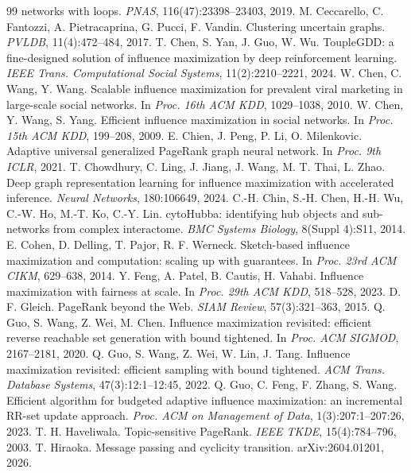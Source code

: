 \documentclass[11pt,a4paper]{article}
\begin{document}
\begin{thebibliography}{99}
networks with loops. \emph{PNAS}, 116(47):23398--23403, 2019.
 M. Ceccarello, C. Fantozzi, A. Pietracaprina, G. Pucci,
F. Vandin. Clustering uncertain graphs. \emph{PVLDB}, 11(4):472--484, 2017.
 T. Chen, S. Yan, J. Guo, W. Wu. ToupleGDD: a
fine-designed solution of influence maximization by deep reinforcement
learning. \emph{IEEE Trans. Computational Social Systems},
11(2):2210--2221, 2024.
 W. Chen, C. Wang, Y. Wang. Scalable influence maximization for
prevalent viral marketing in large-scale social networks. In \emph{Proc. 16th
ACM KDD}, 1029--1038, 2010.
 W. Chen, Y. Wang, S. Yang. Efficient influence maximization
in social networks. In \emph{Proc. 15th ACM KDD}, 199--208, 2009.
 E. Chien, J. Peng, P. Li, O. Milenkovic. Adaptive
universal generalized PageRank graph neural network. In \emph{Proc. 9th
ICLR}, 2021.
 T. Chowdhury, C. Ling, J. Jiang, J. Wang, M. T. Thai,
L. Zhao. Deep graph representation learning for influence maximization with
accelerated inference. \emph{Neural Networks}, 180:106649, 2024.
 C.-H. Chin, S.-H. Chen, H.-H. Wu, C.-W. Ho, M.-T. Ko,
C.-Y. Lin. cytoHubba: identifying hub objects and sub-networks from complex
interactome. \emph{BMC Systems Biology}, 8(Suppl 4):S11, 2014.
 E. Cohen, D. Delling, T. Pajor, R. F. Werneck. Sketch-based
influence maximization and computation: scaling up with guarantees. In
\emph{Proc. 23rd ACM CIKM}, 629--638, 2014.
 Y. Feng, A. Patel, B. Cautis, H. Vahabi. Influence
maximization with fairness at scale. In \emph{Proc. 29th ACM KDD},
518--528, 2023.
 D. F. Gleich. PageRank beyond the Web. \emph{SIAM Review},
57(3):321--363, 2015.
 Q. Guo, S. Wang, Z. Wei, M. Chen. Influence maximization
revisited: efficient reverse reachable set generation with bound tightened.
In \emph{Proc. ACM SIGMOD}, 2167--2181, 2020.
 Q. Guo, S. Wang, Z. Wei, W. Lin, J. Tang. Influence
maximization revisited: efficient sampling with bound tightened. \emph{ACM
Trans. Database Systems}, 47(3):12:1--12:45, 2022.
 Q. Guo, C. Feng, F. Zhang, S. Wang. Efficient algorithm for
budgeted adaptive influence maximization: an incremental RR-set update
approach. \emph{Proc. ACM on Management of Data}, 1(3):207:1--207:26, 2023.
 T. H. Haveliwala. Topic-sensitive PageRank.
\emph{IEEE TKDE}, 15(4):784--796, 2003.
 T. Hiraoka. Message passing and cyclicity transition.
arXiv:2604.01201, 2026.

\end{thebibliography}
\end{document}
